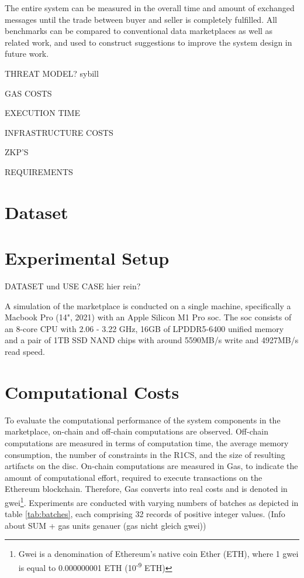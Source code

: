The entire system can be measured in the overall time and amount of exchanged messages until the trade between buyer and seller is completely fulfilled. All benchmarks can be compared to conventional data marketplaces as well as related work, and used to construct suggestions to improve the system design in future work.

THREAT MODEL?
    sybill
    
    
GAS COSTS

EXECUTION TIME

INFRASTRUCTURE COSTS

ZKP'S

REQUIREMENTS

\section{Dataset}

\newcommand\inch{\mbox{''}} 

\section{Experimental Setup}

DATASET und USE CASE hier rein?

A simulation of the marketplace is conducted on a single machine, specifically a Macbook Pro (14", 2021) with an Apple Silicon M1 Pro \acrfull{soc}. The \acrshort{soc} consists of an 8-core CPU with 2.06 - 3.22 GHz, 16GB of LPDDR5-6400 unified memory and a pair of 1TB SSD NAND chips with around 5590MB/s write and 4927MB/s read speed.

\section{Computational Costs}

To evaluate the computational performance of the system components in the marketplace, on-chain and off-chain computations are observed. Off-chain computations are measured in terms of computation time, the average memory consumption, the number of constraints in the R1CS, and the size of resulting artifacts on the disc. On-chain computations are measured in Gas, to indicate the amount of computational effort, required to execute transactions on the Ethereum blockchain. Therefore, Gas converts into real costs and is denoted in gwei\footnote{Gwei is a denomination of Ethereum's native coin Ether (ETH), where 1 gwei is equal to 0.000000001 ETH (10\textsuperscript{-9} ETH)}. Experiments are conducted with varying numbers of batches as depicted in table \ref{tab:batches}, each comprising 32 records of positive integer values. (Info about SUM + gas units genauer (gas nicht gleich gwei))

